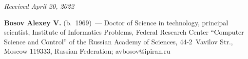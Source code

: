 \vspace*{-6pt}

\hfill{\small\textit{Received April 20, 2022}}

\Contrl

\noindent
\textbf{Bosov Alexey V.} (b.\ 1969)~--- Doctor of Science in technology, principal scientist, 
Institute of Informatics Problems, Federal Research Center ``Computer Science and Control'' of 
the Russian Academy of Sciences, 44-2~Vavilov Str., Moscow 119333, Russian Federation; 
\mbox{avbosov@ipiran.ru}

\label{end\stat}

\renewcommand{\bibname}{\protect\rm Литература}    